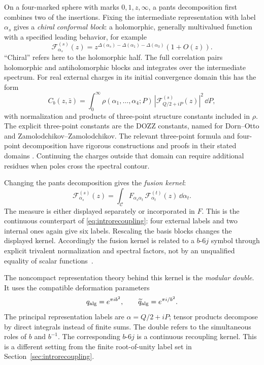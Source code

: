 On a four-marked sphere with marks $0,1,z,\infty$, a pants
decomposition first combines two of the insertions. Fixing the
intermediate representation with label $\alpha_s$ gives a
\emph{chiral conformal block}: a holomorphic, generally
multivalued function with a specified leading behavior, for example
\[
 \mathcal F^{(s)}_{\alpha_s}(z)
       =z^{\Delta(\alpha_s)-\Delta(\alpha_1)-\Delta(\alpha_3)}
                       (1+O(z)).
\]
``Chiral'' refers here to the holomorphic half. The full
correlation pairs holomorphic and antiholomorphic blocks and
integrates over the intermediate spectrum. For real external
charges in its initial convergence domain this has the form
\[
 C_b(z,\bar z)=\int_0^\infty
    \rho(\alpha_1,\ldots,\alpha_4;P)\,
    |\mathcal F^{(s)}_{Q/2+iP}(z)|^2\,\dd P,
\]
with normalization and products of three-point structure constants
included in $\rho$. The explicit three-point constants are the
DOZZ constants, named for Dorn--Otto and Zamolodchikov--Zamolodchikov.
The relevant three-point formula and four-point decomposition have
rigorous constructions and proofs in their stated domains
\cite{KRV,GKRVBootstrap}. Continuing the charges outside that domain
can require additional residues when poles cross the spectral contour.

Changing the pants decomposition gives the \emph{fusion kernel}:
\begin{equation}
 \mathcal F^{(s)}_{\alpha_s}(z)
   =\int_{\mathcal C} F_{\alpha_s\alpha_t}\,
             \mathcal F^{(t)}_{\alpha_t}(z)\,\dd\alpha_t.
 \label{eq:introfusion}
\end{equation}
The measure is either displayed separately or incorporated in $F$.
This is the continuous counterpart of
\eqref{eq:introrecoupling}: four external labels and two internal
ones again give six labels. Rescaling the basis blocks changes
the displayed kernel. Accordingly the fusion kernel is related
to a $b$-$6j$ symbol through explicit trivalent normalization and
spectral factors, not by an unqualified equality of scalar
functions~\cite[Section 4]{TeschnerVartanov}.

The noncompact representation theory behind this kernel is the
\emph{modular double}. It uses the compatible deformation parameters
\[
 q_{\rm alg}=e^{\pi i b^2},\qquad
 \widetilde q_{\rm alg}=e^{\pi i/b^2}.
\]
The principal representation labels are $\alpha=Q/2+iP$; tensor
products decompose by direct integrals instead of finite sums.
The double refers to the simultaneous roles of $b$ and $b^{-1}$.
The corresponding $b$-$6j$ is a continuous recoupling kernel.
This is a different setting from the finite root-of-unity label
set in Section~\ref{sec:introrecoupling}.

